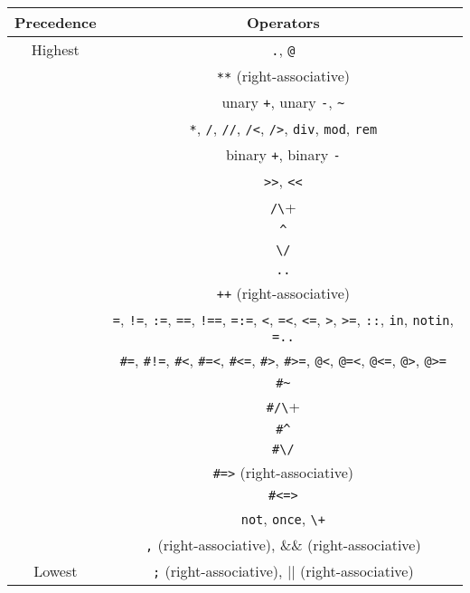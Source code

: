 \begin{center}
\begin{tabular}{ |c|c| } \hline
Precedence & Operators  \\ \hline \hline
Highest    & \verb+.+, \verb+@+ \\ \hline
           & \verb+**+ (right-associative) \\ \hline
           & unary \verb-+-, unary \verb+-+, \verb+~+  \\ \hline 
           & \verb+*+, \verb+/+, \verb+//+, \verb+/<+, \verb+/>+, \verb+div+, \verb+mod+, \verb+rem+ \\ \hline 
           & binary \verb-+-, binary \verb+-+ \\ \hline 
           & \verb+>>+, \verb+<<+ \\ \hline 
           & \verb+/\+ \\ \hline 
           & \verb+^+ \\ \hline 
           & \verb+\/+ \\ \hline 
           & \verb+..+ \\ \hline 
           & \verb-++- (right-associative) \\ \hline 
           & \verb+=+, \verb+!=+,  \verb+:=+,  \verb+==+, \verb+!==+, \verb+=:=+, \verb+<+,  \verb+=<+, \verb+<=+, \verb+>+,  \verb+>=+, \verb+::+, \verb+in+, \verb+notin+, \verb+=..+  \\ 
           &  \verb+#=+,  \verb+#!=+, \verb+#<+,  \verb+#=<+, \verb+#<=+, \verb+#>+, \verb+#>=+, \verb+@<+, \verb+@=<+, \verb+@<=+, \verb+@>+, \verb+@>=+  \\ \hline 
           & \verb+#~+ \\ \hline 
           & \verb+#/\+ \\ \hline 
           & \verb+#^+ \\ \hline 
           & \verb+#\/+ \\ \hline 
           & \verb+#=>+ (right-associative)\\ \hline 
           & \verb+#<=>+ \\ \hline 
           & \verb+not+, \verb+once+, \verb-\+-  \\ \hline 
           & \verb+,+ (right-associative), $\&\&$ (right-associative) \\ \hline 
Lowest     & \verb+;+ (right-associative), $|$$|$ (right-associative) \\ \hline
\end{tabular}
\end{center}

